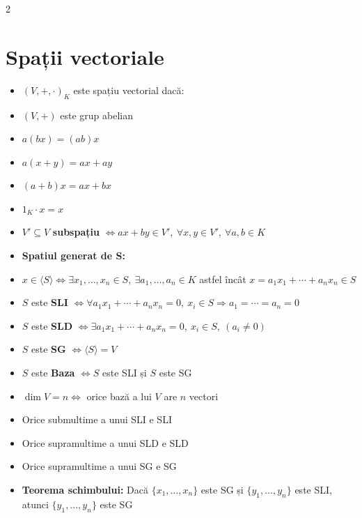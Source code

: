 \documentclass[10pt]{extarticle}
\begin{document}
\begin{multicols*}{2}
\section*{Spații vectoriale}
\begin{itemize}[leftmargin=*]
  \item $(V, +, \cdot)_K$ este spațiu vectorial dacă:
  \item $(V, +)$ este grup abelian
  \item $a(bx) = (ab)x$
  \item $a(x + y) = ax + ay$
  \item $(a + b)x = ax + bx$
  \item $1_K \cdot x = x$
  \item $V' \subseteq V$ \textbf{subspațiu} $\Leftrightarrow ax + by \in V',\ \forall x, y \in V',\ \forall a, b \in K$
  \item \textbf{Spatiul generat de S:}
  \item $x \in \langle S \rangle \Leftrightarrow 
  \exists x_1, \dots, x_n \in S,\ \exists a_1, \dots, a_n \in K$ astfel încât $x = a_1x_1 + \cdots + a_nx_n \in S$
  \item $S$ este \textbf{SLI} $\Leftrightarrow \forall a_1x_1 + \cdots + a_nx_n = 0,\ x_i \in S \Rightarrow a_1 = \cdots = a_n = 0$
  \item $S$ este \textbf{SLD} $\Leftrightarrow \exists a_1x_1 + \cdots + a_nx_n = 0,\ x_i \in S,\ (a_i \ne 0)$
  \item $S$ este \textbf{SG} $\Leftrightarrow \langle S \rangle = V$
  \item $S$ este \textbf{Baza} $\Leftrightarrow S$ este SLI și $S$ este SG
  \item $\dim V = n \Leftrightarrow$ orice bază a lui $V$ are $n$ vectori
  \item Orice submultime a unui SLI e SLI
  \item Orice supramultime a unui SLD e SLD
  \item Orice supramultime a unui SG e SG
  \item \textbf{Teorema schimbului:} Dacă $\{x_1, \dots, x_n\}$ este SG și $\{y_1, \dots, y_n\}$ este SLI, atunci $\{y_1, \dots, y_n\}$ este SG
\end{itemize}


\end{multicols*}
\end{document}

